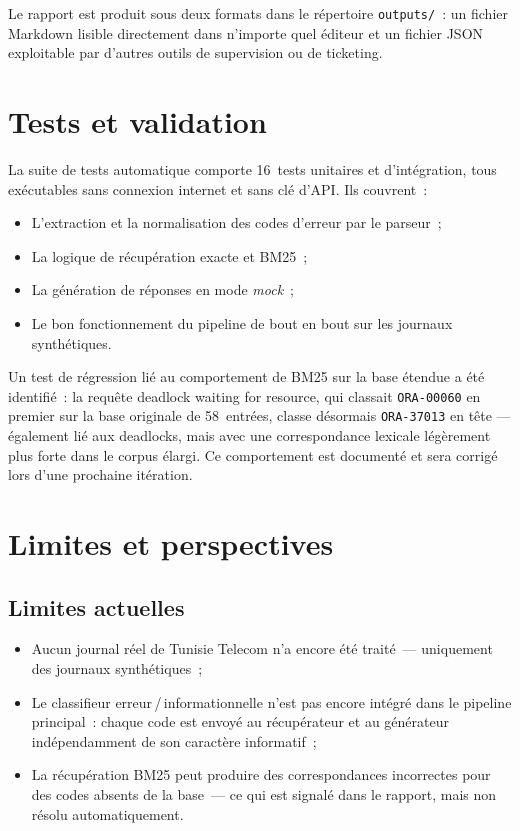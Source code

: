 \documentclass[12pt,a4paper]{report}
\begin{document}
Le rapport est produit sous deux formats dans le r\'epertoire \texttt{outputs/}~:
un fichier Markdown lisible directement dans n'importe quel \'editeur et un fichier
JSON exploitable par d'autres outils de supervision ou de ticketing.

\section{Tests et validation}

La suite de tests automatique comporte 16~tests unitaires et d'int\'egration, tous
ex\'ecutables sans connexion internet et sans cl\'e d'API. Ils couvrent~:

\begin{itemize}[leftmargin=*]
  \item L'extraction et la normalisation des codes d'erreur par le parseur~;
  \item La logique de r\'ecup\'eration exacte et BM25~;
  \item La g\'en\'eration de r\'eponses en mode \emph{mock}~;
  \item Le bon fonctionnement du pipeline de bout en bout sur les journaux synth\'etiques.
\end{itemize}

Un test de r\'egression li\'e au comportement de BM25 sur la base \'etendue a \'et\'e
identifi\'e~: la requ\^ete \og{}deadlock waiting for resource\fg{}, qui classait
\texttt{ORA-00060} en premier sur la base originale de 58~entr\'ees, classe d\'esormais
\texttt{ORA-37013} en t\^ete --- \'egalement li\'e aux deadlocks, mais avec une
correspondance lexicale l\'eg\`erement plus forte dans le corpus \'elargi. Ce
comportement est document\'e et sera corrig\'e lors d'une prochaine it\'eration.

\section{Limites et perspectives}

\subsection{Limites actuelles}

\begin{itemize}[leftmargin=*]
  \item Aucun journal r\'eel de Tunisie Telecom n'a encore \'et\'e trait\'e~---
        uniquement des journaux synth\'etiques~;
  \item Le classifieur erreur\,/\,informationnelle n'est pas encore int\'egr\'e dans
        le pipeline principal~: chaque code est envoy\'e au r\'ecup\'erateur et au
        g\'en\'erateur ind\'ependamment de son caract\`ere informatif~;
  \item La r\'ecup\'eration BM25 peut produire des correspondances incorrectes pour des
        codes absents de la base~--- ce qui est signal\'e dans le rapport, mais non
        r\'esolu automatiquement.
\end{itemize}
\end{document}
